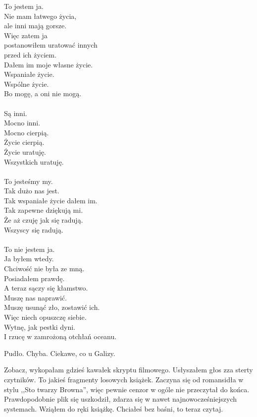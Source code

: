 \begin{poem}
	To jestem ja. \\
	Nie mam łatwego życia, \\
	ale inni mają gorsze. \\
	Więc zatem ja \\
	postanowiłem uratować innych \\
	przed ich życiem. \\
	Dałem im moje własne życie. \\
	Wspaniałe życie. \\
	Wspólne życie. \\
	Bo mogę, a oni nie mogą. \\
	\\
	Są inni. \\
	Mocno inni. \\
	Mocno cierpią. \\
	Życie cierpią. \\
	Życie uratuję. \\
	Wszystkich uratuję. \\
	\\
	To jesteśmy my. \\
	Tak dużo nas jest. \\
	Tak wspaniałe życie dałem im. \\
	Tak zapewne dziękują mi. \\
	Że aż czuję jak się radują. \\
	Wszyscy się radują. \\
	\\
	To nie jestem ja. \\
	Ja byłem wtedy. \\
	Chciwość nie była ze mną. \\
	Posiadałem prawdę. \\
	A teraz sączy się kłamstwo. \\
	Muszę nas naprawić. \\
	Muszę usunąć zło, zostawić ich. \\
	Więc niech opuszczę siebie. \\
	Wytnę, jak pestki dyni. \\
	I rzucę w zamrożoną otchłań oceanu.
\end{poem}

Pudło. Chyba. Ciekawe, co u Galizy.

\begin{dialogue}
	\ds{} Zobacz, wykopałam gdzieś kawałek skryptu filmowego. \dm{} Usłyszałem głos zza sterty czytników. \dm{} To jakieś fragmenty losowych książek.
	Zaczyna się od romansidła w stylu ,,Sto twarzy Browna'', więc pewnie cenzor w ogóle nie przeczytał do końca.
	\ds{} Prawdopodobnie plik się uszkodził, zdarza się w nawet najnowocześniejszych systemach. \dm{} Wziąłem do ręki książkę.
	\ds{} Chciałeś bez baśni, to teraz czytaj.
\end{dialogue}

